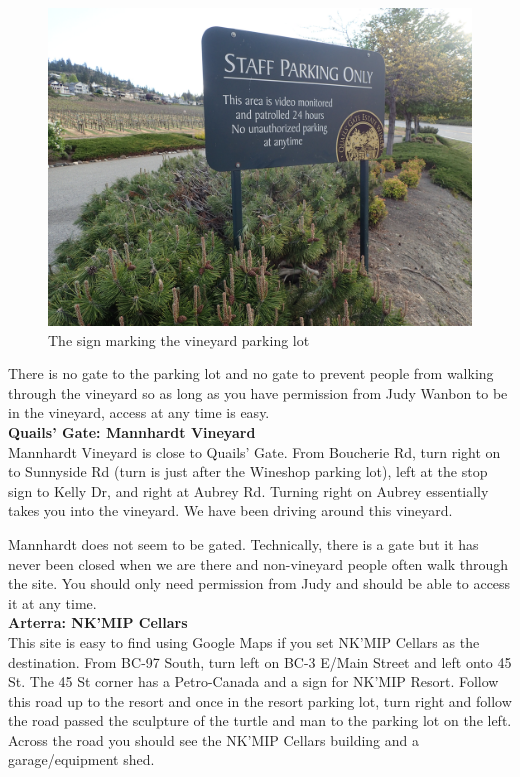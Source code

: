 \documentclass[11pt,letter]{article}
\begin{document}
\begin{figure} [h]
  \includegraphics[scale = .25]{qgParkingLot.JPG}
  \caption{The sign marking the vineyard parking lot }
  \label{fig:QGparkingLot}
\end{figure}

There is no gate to the parking lot and no gate to prevent people from walking through the vineyard so as long as you have permission from Judy Wanbon to be in the vineyard, access at any time is easy. \\

{\bf Quails' Gate: Mannhardt Vineyard} \\
Mannhardt Vineyard is close to Quails' Gate. From Boucherie Rd, turn right on to Sunnyside Rd (turn is just after the Wineshop parking lot), left at the stop sign to Kelly Dr, and right at Aubrey Rd. Turning right on Aubrey essentially takes you into the vineyard. We have been driving around this vineyard.

Mannhardt does not seem to be gated. Technically, there is a gate but it has never been closed when we are there and non-vineyard people often walk through the site. You should only need permission from Judy and should be able to access it at any time. \\

{\bf Arterra: NK'MIP Cellars} \\
This site is easy to find using Google Maps if you set NK'MIP Cellars as the destination.
From BC-97 South, turn left on BC-3 E/Main Street and left onto 45 St. The 45 St corner has a Petro-Canada and a sign for NK'MIP Resort. Follow this road up to the resort and once in the resort parking lot, turn right and follow the road passed the sculpture of the turtle and man to the parking lot on the left. Across the road you should see the NK'MIP Cellars building and a garage/equipment shed. 
\end{document}
